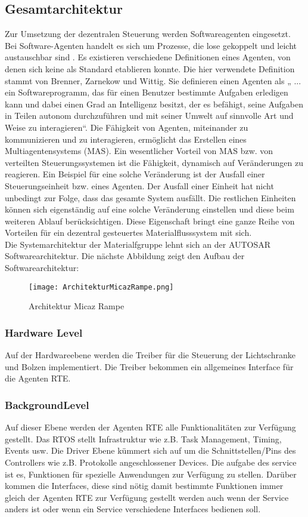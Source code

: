 \subsection{Gesamtarchitektur}
Zur Umsetzung der dezentralen Steuerung werden Softwareagenten eingesetzt. Bei Software-Agenten handelt es sich um Prozesse, die lose gekoppelt 
und leicht austauschbar sind \cite[vgl.][S. 31-37]{GH:2010}. Es existieren verschiedene Definitionen eines Agenten, von denen
sich keine als Standard etablieren konnte. Die hier verwendete Definition stammt von
Brenner, Zarnekow und Wittig. Sie definieren einen Agenten als „ ... ein Softwareprogramm,
das für einen Benutzer bestimmte Aufgaben erledigen kann und dabei einen Grad an
Intelligenz besitzt, der es befähigt, seine Aufgaben in Teilen autonom durchzuführen und mit
seiner Umwelt auf sinnvolle Art und Weise zu interagieren“\cite{BZW:1998}. Die Fähigkeit von Agenten, miteinander zu kommunizieren 
und zu interagieren, ermöglicht das Erstellen eines Multiagentensystems (MAS). Ein wesentlicher Vorteil von MAS 
bzw. von verteilten Steuerungssystemen ist die Fähigkeit, dynamisch auf Veränderungen zu reagieren. Ein Beispiel für eine solche Veränderung ist der
Ausfall einer Steuerungseinheit bzw. eines Agenten. Der Ausfall einer Einheit hat nicht unbedingt zur Folge, dass das gesamte System ausfällt. 
Die restlichen Einheiten können sich eigenständig auf eine solche Veränderung einstellen und diese beim weiteren Ablauf
berücksichtigen\cite[S. 13]{Roidl:2012}. Diese Eigenschaft bringt eine ganze Reihe von Vorteilen für ein dezentral
gesteuertes Materialflusssystem mit sich.\\
Die Systemarchitektur der Materialfgruppe lehnt sich an der AUTOSAR Softwarearchitektur. 
Die nächste Abbildung zeigt den Aufbau der Softwarearchitektur:
\begin{figure}[h!]
	\centering
		\texttt{[image: ArchitekturMicazRampe.png]}
	\caption{Architektur Micaz Rampe\cite{Stasch:Hahn}}
	\label{ArchitekturMicazRampe}
\end{figure}
\subsubsection{Hardware Level}
Auf der Hardwareebene werden die Treiber für die Steuerung der Lichtschranke und Bolzen implementiert. Die Treiber bekommen ein
allgemeines Interface für die Agenten RTE.
\subsubsection{BackgroundLevel}
Auf dieser Ebene werden der Agenten RTE alle Funktionalitäten zur Verfügung gestellt. Das RTOS stellt Infrastruktur wie z.B. Task Management, 
Timing, Events usw. Die Driver Ebene kümmert sich auf um die Schnittstellen/Pins des Controllers wie z.B. Protokolle angeschlossener
Devices\cite[S. 26]{Stasch:Hahn}. Die aufgabe des service ist es, Funktionen für spezielle Anwendungen zur Verfügung zu stellen.
Darüber kommen die Interfaces, diese sind nötig damit bestimmte Funktionen immer gleich der Agenten RTE zur Verfügung gestellt werden 
auch wenn der Service anders ist oder wenn ein Service verschiedene Interfaces bedienen soll\cite[S. 26]{Stasch:Hahn}.
